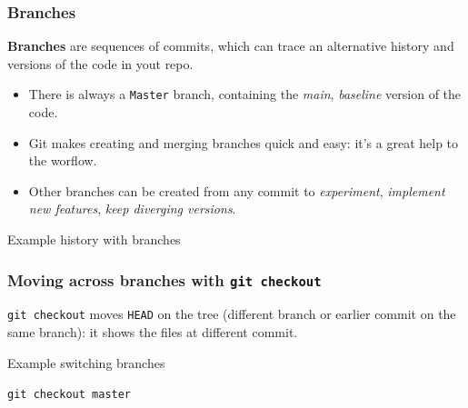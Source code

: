 \documentclass[10pt,svgnames,handout]{beamer}
\begin{document}
\begin{frame}
\frametitle{Branches}

\textbf{Branches} are sequences of commits, which can trace an alternative history and versions of the code in yout repo.\\
\begin{itemize}
  \item There is always a \lstinline{Master} branch, containing the \emph{main}, \emph{baseline} version of the code.
  \item Git makes creating and merging branches quick and easy: it's a great help to the worflow.
  \item Other branches can be created from any commit to \emph{experiment}, \emph{implement new features}, \emph{keep diverging versions}.
\end{itemize}
\pause

\begin{block}{Example history with branches}

\end{block}

\end{frame}


\begin{frame}
\frametitle{Moving across branches with \lstinline{git checkout}}

\lstinline{git checkout} moves \lstinline{HEAD} on the tree (different branch or earlier commit on the same branch): it shows the files at  different commit.\\
\medskip
\pause

\begin{block}{Example switching branches}

\pause
\lstinline{git checkout master}
\pause


\end{block}
\end{frame}
\end{document}
